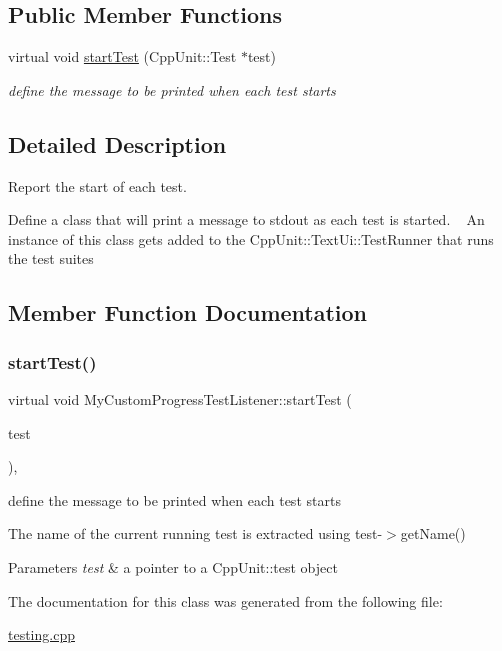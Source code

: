 \subsection*{Public Member Functions}
\begin{DoxyCompactItemize}
\item 
virtual void \mbox{\hyperlink{classMyCustomProgressTestListener_a798f9c66a689cbe41701b582b9033892}{start\+Test}} (Cpp\+Unit\+::\+Test $\ast$test)
\begin{DoxyCompactList}\small\item\em define the message to be printed when each test starts \end{DoxyCompactList}\end{DoxyCompactItemize}


\subsection{Detailed Description}
Report the start of each test. 

Define a class that will print a message to stdout as each test is started. ~\newline
An instance of this class gets added to the Cpp\+Unit\+::\+Text\+Ui\+::\+Test\+Runner that runs the test suites 

\subsection{Member Function Documentation}
\mbox{\label{classMyCustomProgressTestListener_a798f9c66a689cbe41701b582b9033892}} 
\subsubsection{\texorpdfstring{start\+Test()}{startTest()}}
{\footnotesize\ttfamily virtual void My\+Custom\+Progress\+Test\+Listener\+::start\+Test (\begin{DoxyParamCaption}\item[{Cpp\+Unit\+::\+Test $\ast$}]{test }\end{DoxyParamCaption})\hspace{0.3cm}{\ttfamily [inline]}, {\ttfamily [virtual]}}



define the message to be printed when each test starts 

The name of the current running test is extracted using test-\/$>$get\+Name() 
\begin{DoxyParams}{Parameters}
{\em test} & a pointer to a Cpp\+Unit\+::test object \\
\hline
\end{DoxyParams}


The documentation for this class was generated from the following file\+:\begin{DoxyCompactItemize}
\item 
\mbox{\hyperlink{testing_8cpp}{testing.\+cpp}}\end{DoxyCompactItemize}

